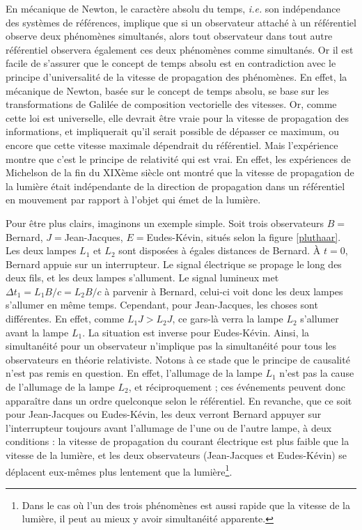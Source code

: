 		En mécanique de Newton, le caractère absolu du temps, \emph{i.e.} son indépendance des systèmes de références, implique que si un observateur attaché à un référentiel observe deux phénomènes simultanés, alors tout observateur dans tout autre référentiel observera également ces deux phénomènes comme simultanés. Or il est facile de s'assurer que le concept de temps absolu est en contradiction avec le principe d'universalité de la vitesse de propagation des phénomènes. En effet, la mécanique de Newton, basée sur le concept de temps absolu, se base sur les transformations de Galilée de composition vectorielle des vitesses. Or, comme cette loi est universelle, elle devrait être vraie pour la vitesse de propagation des informations, et impliquerait qu'il serait possible de dépasser ce maximum, ou encore que cette vitesse maximale dépendrait du référentiel. Mais l'expérience montre que c'est le principe de relativité qui est vrai. En effet, les expériences de Michelson de la fin du XIXème siècle ont montré que la vitesse de propagation de la lumière était indépendante de la direction de propagation dans un référentiel en mouvement par rapport à l'objet qui émet de la lumière. 

		Pour être plus clairs, imaginons un exemple simple. Soit trois observateurs $B=$Bernard, $J=$Jean-Jacques, $E=$Eudes-Kévin, situés selon la figure \ref{pluthaar}. Les deux lampes $L_1$ et $L_2$ sont disposées à égales distances de Bernard. À $t=0$, Bernard appuie sur un interrupteur. Le signal électrique se propage le long des deux fils, et les deux lampes s'allument. Le signal lumineux met $\Delta t_1=L_1B/c=L_2B/c$ à parvenir à Bernard, celui-ci voit donc les deux lampes s'allumer en même temps. Cependant, pour Jean-Jacques, les choses sont différentes. En effet, comme $L_1J>L_2J$, ce gars-là verra la lampe $L_2$ s'allumer avant la lampe $L_1$. La situation est inverse pour Eudes-Kévin. Ainsi, la simultanéité pour un observateur n'implique pas la simultanéité pour tous les observateurs en théorie relativiste. Notons à ce stade que le principe de causalité n'est pas remis en question. En effet, l'allumage de la lampe $L_1$ n'est pas la cause de l'allumage de la lampe $L_2$, et réciproquement ; ces événements peuvent donc apparaître dans un ordre quelconque selon le référentiel. En revanche, que ce soit pour Jean-Jacques ou Eudes-Kévin, les deux verront Bernard appuyer sur l'interrupteur toujours avant l'allumage de l'une ou de l'autre lampe, à deux conditions : la vitesse de propagation du courant électrique est plus faible que la vitesse de la lumière, et les deux observateurs (Jean-Jacques et Eudes-Kévin) se déplacent eux-mêmes plus lentement que la lumière\footnote{Dans le cas où l'un des trois phénomènes est aussi rapide que la vitesse de la lumière, il peut au mieux y avoir simultanéité apparente.}.

